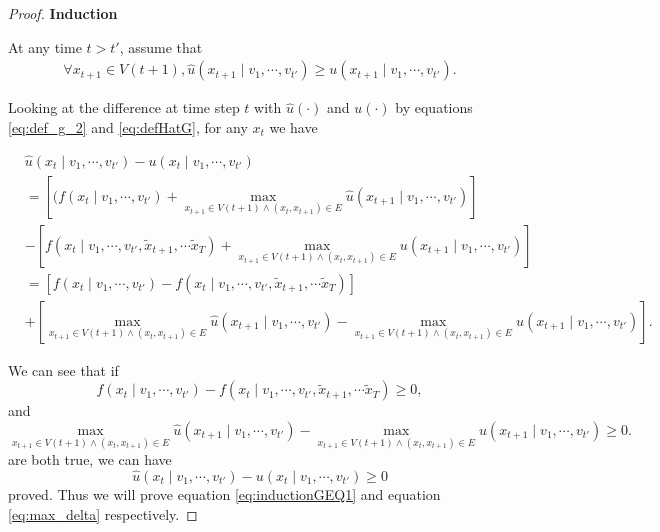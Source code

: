 \begin{lem}
\begin{proof}
\textbf{Induction}

At any time $ t > t' $, assume that
\begin{equation}
\label{eq:inductionAssumption}
\begin{aligned}
\forall x_{t+1} \in V(t+1), \hat{u}(x_{t+1} \mid v_{1} , \cdots , v_{t'} ) \geq u(x_{t+1} \mid v_{1} , \cdots , v_{t'} ).
\end{aligned}
\end{equation}

Looking at the difference at time step $ t $ with  $ \hat{u}(\cdot) $ and $ u(\cdot) $ by equations \eqref{eq:def_g_2} and \eqref{eq:defHatG}, for any $ x_{t} $ we have

\begin{equation}
\label{eq:extendDifference}
\begin{aligned}
& \hat{u}( x_{t} \mid v_{1} , \cdots , v_{t'} ) - u(x_{t} \mid v_{1} , \cdots , v_{t'} ) \\
& = \left[( f( x_{t} \mid v_{1} , \cdots , v_{t'} ) + \max_{x_{t+1} \in V(t+1) \land (x_{t}, x_{t+1}) \in E } \hat{u}( x_{t+1} \mid v_{1} , \cdots , v_{t'} ) \right]  \\
& - \left[  f( x_{t} \mid v_{1} , \cdots , v_{t'}, \tilde{x}_{t+1}, \cdots \tilde{x}_{T} ) +  \max_{x_{t+1} \in V(t+1) \land ( x_{t}, x_{t+1} ) \in E } u( x_{t+1} \mid v_{1} , \cdots , v_{t'} ) \right]  \\
& = \left[ f(x_{t} \mid v_{1} , \cdots , v_{t'} ) - f(x_{t} \mid v_{1} , \cdots , v_{t'}, \tilde{x}_{t+1}, \cdots \tilde{x}_{T} ) \right] \\
& + \left[ \max_{ x_{t+1} \in V(t+1) \land ( x_{t}, x_{t+1} ) \in E } \hat{u}( x_{t+1} \mid v_{1} , \cdots , v_{t'} ) - \max_{x_{t+1} \in V(t+1) \land ( x_{t}, x_{t+1} ) \in E } u( x_{t+1} \mid v_{1} , \cdots , v_{t'} ) \right] .
\end{aligned}
\end{equation}

We can see that if 
\begin{equation}
\label{eq:inductionGEQ1}
f( x_{t} \mid v_{1} , \cdots , v_{t'} ) - f(x_{t} \mid v_{1} , \cdots , v_{t'}, \tilde{x}_{t+1}, \cdots \tilde{x}_{T} ) \geq 0,
\end{equation}
and
\begin{equation}
\label{eq:max_delta}
\max_{ x_{t+1} \in V(t+1) \land ( x_{t}, x_{t+1} ) \in E } \hat{u}( x_{t+1} \mid v_{1} , \cdots , v_{t'} ) - \max_{ x_{t+1} \in V(t+1) \land ( x_{t}, x_{t+1} ) \in E } u( x_{t+1} \mid v_{1} , \cdots , v_{t'} ) \geq 0.
\end{equation}
are both true, we can have
\begin{equation}
\label{eq:extendDifference_geq_0}
\hat{u}( x_{t} \mid v_{1} , \cdots , v_{t'} ) - u( x_{t} \mid v_{1} , \cdots , v_{t'} ) \geq 0
\end{equation}
proved. Thus we will prove equation \eqref{eq:inductionGEQ1} and equation \eqref{eq:max_delta} respectively.


\end{proof}
\end{lem}
